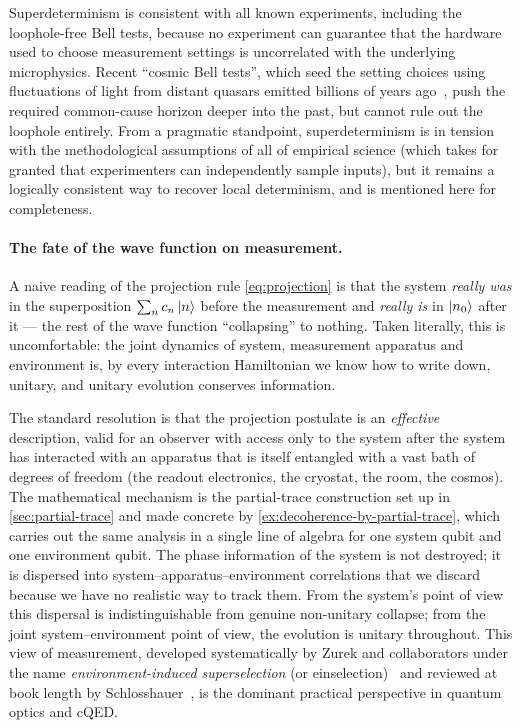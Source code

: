Superdeterminism is consistent with all known experiments,
including the loophole-free Bell tests, because no experiment can
guarantee that the hardware used to choose measurement settings is
uncorrelated with the underlying microphysics. Recent ``cosmic
Bell tests'', which seed the setting choices using fluctuations of
light from distant quasars emitted billions of years
ago~\cite{rauch2018}, push the required common-cause horizon
deeper into the past, but cannot rule out the loophole entirely.
From a pragmatic standpoint, superdeterminism is in tension with
the methodological assumptions of all of empirical science (which
takes for granted that experimenters can independently sample
inputs), but it remains a logically consistent way to recover
local determinism, and is mentioned here for completeness.

\paragraph{The fate of the wave function on measurement.}
A naive reading of the projection rule \cref{eq:projection} is that
the system \emph{really was} in the superposition $\sum_n c_n\ket{n}$
before the measurement and \emph{really is} in $\ket{n_0}$ after it
--- the rest of the wave function ``collapsing'' to nothing. Taken
literally, this is uncomfortable: the joint dynamics of system,
measurement apparatus and environment is, by every interaction
Hamiltonian we know how to write down, unitary, and unitary
evolution conserves information.

The standard resolution is that the projection postulate is an
\emph{effective} description, valid for an observer with access only
to the system after the system has interacted with an apparatus
that is itself entangled with a vast bath of degrees of freedom
(the readout electronics, the cryostat, the room, the cosmos). The
mathematical mechanism is the partial-trace construction set up in
\cref{sec:partial-trace} and made concrete by
\cref{ex:decoherence-by-partial-trace}, which carries out the same
analysis in a single line of algebra for one system qubit and one
environment qubit. The phase information of the system is not
destroyed; it is dispersed into system--apparatus--environment
correlations that we discard because we have no realistic way to
track them. From the system's point of view this dispersal is
indistinguishable from genuine non-unitary collapse; from the joint
system--environment point of view, the evolution is unitary
throughout. This view of measurement, developed systematically by
Zurek and collaborators under the name \emph{environment-induced
superselection} (or einselection)~\cite{zurek2003} and reviewed at
book length by Schlosshauer~\cite{schlosshauer2007}, is the
dominant practical perspective in quantum optics and cQED.

